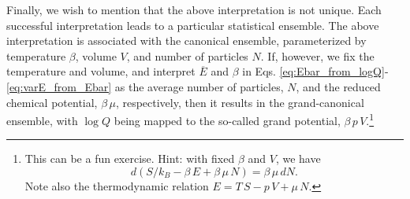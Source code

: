 \documentclass{article}
\begin{document}
Finally, we wish to mention that the above interpretation is not unique.
%
Each successful interpretation leads to a particular statistical ensemble.
%
The above interpretation is associated with the canonical ensemble,
parameterized by temperature $\beta$, volume $V$, and number of particles $N$.
%
If, however, we fix the temperature and volume,
and interpret $\overline E$ and $\beta$ in
Eqs. \eqref{eq:Ebar_from_logQ}-\eqref{eq:varE_from_Ebar}
as the average number of particles, $N$,
and the reduced chemical potential, $\beta \, \mu$, respectively,
then it results in the grand-canonical ensemble,
with $\log Q$ being mapped to the so-called grand potential,
$\beta \, p \, V$.\footnote{This can be a fun exercise. Hint:
with fixed $\beta$ and $V$, we have
$$
d(S/k_B - \beta \, E + \beta \, \mu \, N ) = \beta \, \mu \, d N.
$$
Note also the thermodynamic relation $E = T \, S - p \, V + \mu \, N$.
}
\end{document}
